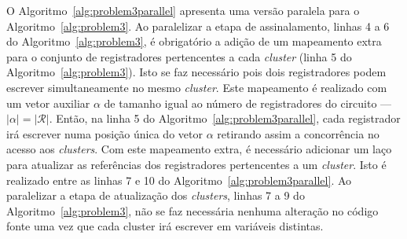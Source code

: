

O Algoritmo~\ref{alg:problem3parallel} apresenta uma versão paralela para o Algoritmo~\ref{alg:problem3}.
Ao paralelizar a etapa de assinalamento, linhas 4 a 6 do Algoritmo~\ref{alg:problem3}, é obrigatório a adição de um mapeamento extra para o conjunto de registradores pertencentes a cada \textit{cluster} (linha 5 do Algoritmo~\ref{alg:problem3}). Isto se faz necessário pois dois registradores podem escrever simultaneamente no mesmo \textit{cluster}.
Este mapeamento é realizado com um vetor auxiliar $\alpha$ de tamanho igual ao número de registradores do circuito --- $|\alpha| = |\mathcal{R}|$.
Então, na linha 5 do Algoritmo~\ref{alg:problem3parallel}, cada registrador irá escrever numa posição única do vetor $\alpha$ retirando assim a concorrência no acesso aos \textit{clusters}.
Com este mapeamento extra, é necessário adicionar um laço para atualizar as referências dos registradores pertencentes a um \textit{cluster}.
Isto é realizado entre as linhas 7 e 10 do Algoritmo~\ref{alg:problem3parallel}.
Ao paralelizar a etapa de atualização dos \textit{clusters}, linhas  7 a 9 do Algoritmo~\ref{alg:problem3}, não se faz necessária nenhuma alteração no código fonte uma vez que cada cluster irá escrever em variáveis distintas.

